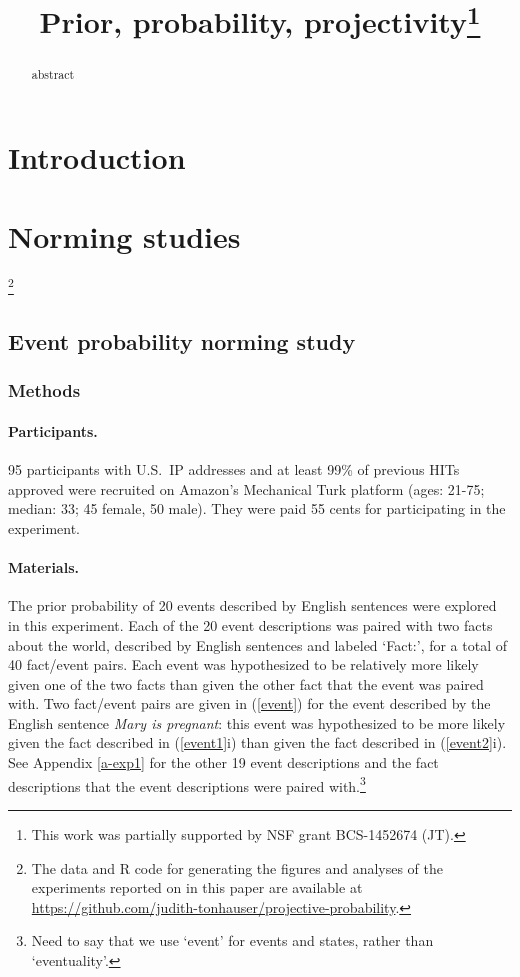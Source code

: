\documentclass[11pt,fleqn]{article}
\title{Prior, probability, projectivity\thanks{This work was partially supported by NSF grant BCS-1452674 (JT).}}
\newcommand{\6}{\mbox{$[\hspace*{-.6mm}[$}}
\newcommand{\9}{\mbox{$]\hspace*{-.6mm}]$}}
\begin{document}
\maketitle

\begin{abstract}
abstract
\end{abstract}


			
\section{Introduction}\label{s1}

\citealt*{tbd-variability}

\section{Norming studies}\label{s-pretests}

\footnote{\label{f-github}The
data and R code for generating the figures and analyses
of the experiments reported on in this paper are available at \url{https://github.com/judith-tonhauser/projective-probability}.}

\subsection{Event probability norming study}\label{s-pretest1}

\subsubsection{Methods}\label{s-methods-1}

\paragraph{Participants.} 95 participants with U.S.\ IP addresses and at least 99\% of previous HITs approved were recruited on Amazon's Mechanical Turk platform (ages: 21-75; median: 33; 45 female, 50 male). They were paid 55 cents for participating in the experiment. 

\paragraph{Materials.} The prior probability of 20 events described by English sentences were explored in this experiment. Each of the 20 event descriptions was paired with two facts about the world, described by English sentences and labeled `Fact:', for a total of 40 fact/event pairs. Each event was hypothesized to be relatively more likely given one of the two facts than given the other fact that the event was paired with. Two fact/event pairs are given in (\ref{event}) for the event described by the English sentence {\em Mary is pregnant}: this event was hypothesized to be more likely given the fact described in (\ref{event1}i) than given the fact described in (\ref{event2}i). See Appendix \ref{a-exp1} for the other 19 event descriptions and the fact descriptions that the event descriptions were paired with.\footnote{Need to say that we use `event' for events and states, rather than `eventuality'.}
\end{document}
